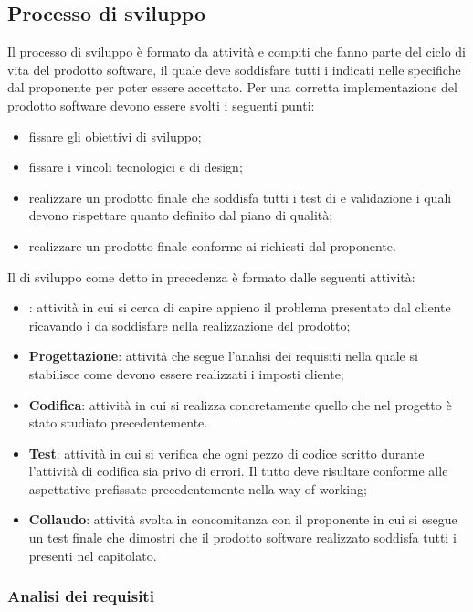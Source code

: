 \subsection{Processo di sviluppo}
Il processo di sviluppo è formato da attività e compiti che fanno parte del ciclo di vita del prodotto software, il quale deve soddisfare tutti i  indicati nelle specifiche dal proponente per poter essere accettato.
Per una corretta implementazione del prodotto software devono essere svolti i seguenti punti: 
\begin{itemize}
	\item fissare gli obiettivi di sviluppo;
	\item fissare i vincoli tecnologici e di design;
	\item realizzare un prodotto finale che soddisfa tutti i test di  e validazione i quali devono rispettare quanto definito dal piano di qualità;
	\item realizzare un prodotto finale conforme ai  richiesti dal proponente.
\end{itemize}		
Il  di sviluppo come detto in precedenza è formato dalle seguenti attività:
\begin{itemize}
	\item \textbf{\AdR{}}: attività in cui si cerca di capire appieno il problema presentato dal cliente ricavando i  da soddisfare nella realizzazione del prodotto;
	\item \textbf{Progettazione}: attività che segue l'analisi dei requisiti nella quale si stabilisce come devono essere realizzati i  imposti cliente;
	\item \textbf{Codifica}: attività in cui si realizza concretamente quello che nel progetto è stato  studiato precedentemente.
	\item \textbf{Test}: attività in cui si verifica che ogni pezzo di codice scritto durante l'attività di codifica sia privo di errori. Il tutto deve risultare conforme alle aspettative prefissate precedentemente nella way of working;
\item \textbf{Collaudo}: attività svolta in concomitanza con il proponente in cui si esegue un test finale che dimostri che il prodotto software realizzato soddisfa tutti i  presenti nel capitolato.
\end{itemize}
\subsubsection{Analisi dei requisiti}
